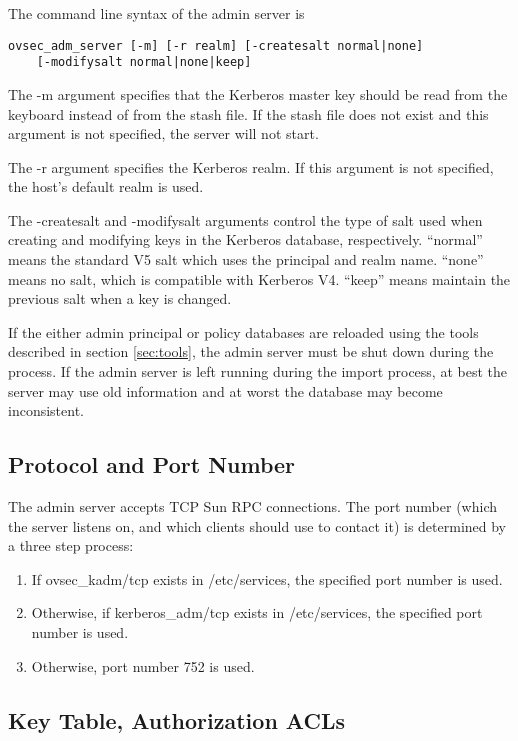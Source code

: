 The command line syntax of the admin server is

\begin{verbatim}
ovsec_adm_server [-m] [-r realm] [-createsalt normal|none]
	[-modifysalt normal|none|keep] 
\end{verbatim}

The -m argument specifies that the Kerberos master key should be read
from the keyboard instead of from the stash file.  If the stash file
does not exist and this argument is not specified, the server will
not start.

The -r argument specifies the Kerberos realm.  If this argument is not
specified, the host's default realm is used. 

The -createsalt and -modifysalt arguments control the type of salt
used when creating and modifying keys in the Kerberos database,
respectively.  ``normal'' means the standard V5 salt which uses the
principal and realm name.  ``none'' means no salt, which is compatible
with Kerberos V4.  ``keep'' means maintain the previous salt when a
key is changed.

If the either admin principal or policy databases are reloaded using
the tools described in section \ref{sec:tools}, the admin server must
be shut down during the process.  If the admin server is left running
during the import process, at best the server may use old information
and at worst the database may become inconsistent.

\subsection{Protocol and Port Number}

The admin server accepts TCP Sun RPC connections.  The port number
(which the server listens on, and which clients should use to contact
it) is determined by a three step process:

\begin{enumerate}
\item If ovsec_kadm/tcp exists in /etc/services, the specified port
number is used.

\item Otherwise, if kerberos_adm/tcp exists in /etc/services, the
specified port number is used.

\item Otherwise, port number 752 is used.
\end{enumerate}

\subsection{Key Table, Authorization ACLs}
\label{sec:acls}

